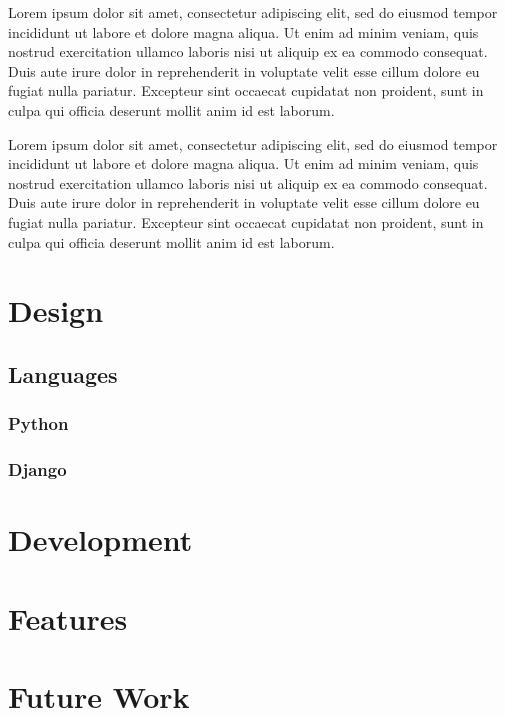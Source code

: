 \documentclass{article}
\begin{document}
Lorem ipsum dolor sit amet, consectetur adipiscing elit, sed do eiusmod tempor incididunt ut labore et dolore magna aliqua. Ut enim ad minim veniam, quis nostrud exercitation ullamco laboris nisi ut aliquip ex ea commodo consequat. Duis aute irure dolor in reprehenderit in voluptate velit esse cillum dolore eu fugiat nulla pariatur. Excepteur sint occaecat cupidatat non proident, sunt in culpa qui officia deserunt mollit anim id est laborum.

Lorem ipsum dolor sit amet, consectetur adipiscing elit, sed do eiusmod tempor incididunt ut labore et dolore magna aliqua. Ut enim ad minim veniam, quis nostrud exercitation ullamco laboris nisi ut aliquip ex ea commodo consequat. Duis aute irure dolor in reprehenderit in voluptate velit esse cillum dolore eu fugiat nulla pariatur. Excepteur sint occaecat cupidatat non proident, sunt in culpa qui officia deserunt mollit anim id est laborum.

\section{Design}
	\subsection{Languages}
		\subsubsection{Python}
		\subsubsection{Django}
\section{Development}
\section{Features}
\section{Future Work}

\printbibliography[title={Bibliography}]
\end{document}
